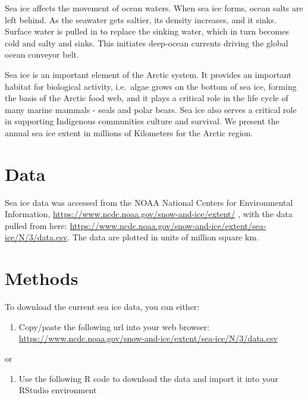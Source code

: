 \documentclass[
]{book}
\providecommand{\tightlist}{%
  \setlength{\itemsep}{0pt}\setlength{\parskip}{0pt}}
\begin{document}
Sea ice affects the movement of ocean waters. When sea ice forms, ocean salts are left behind. As the seawater gets saltier, its density increases, and it sinks. Surface water is pulled in to replace the sinking water, which in turn becomes cold and salty and sinks. This initiates deep-ocean currents driving the global ocean conveyor belt.

Sea ice is an important element of the Arctic system. It provides an important habitat for biological activity, i.e.~algae grows on the bottom of sea ice, forming the basis of the Arctic food web, and it plays a critical role in the life cycle of many marine mammals - seals and polar bears. Sea ice also serves a critical role in supporting Indigenous communities culture and survival. We present the annual sea ice extent in millions of Kilometers for the Arctic region.

\hypertarget{data-10}{%
\section{Data}\label{data-10}}

Sea ice data was accessed from the NOAA National Centers for Environmental Information, \url{https://www.ncdc.noaa.gov/snow-and-ice/extent/} , with the data pulled from here: \url{https://www.ncdc.noaa.gov/snow-and-ice/extent/sea-ice/N/3/data.csv}. The data are plotted in units of million square km.

\hypertarget{methods-10}{%
\section{Methods}\label{methods-10}}

To download the current sea ice data, you can either:

\begin{enumerate}
\def\labelenumi{\arabic{enumi})}
\tightlist
\item
  Copy/paste the following url into your web browser:
  \url{https://www.ncdc.noaa.gov/snow-and-ice/extent/sea-ice/N/3/data.csv}
\end{enumerate}

or

\begin{enumerate}
\def\labelenumi{\arabic{enumi})}
\setcounter{enumi}{1}
\tightlist
\item
  Use the following R code to download the data and import it into your RStudio environment
\end{enumerate}
\end{document}
